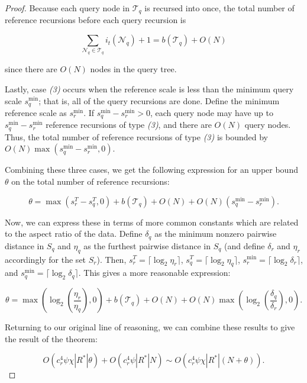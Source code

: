 \begin{proof}
Because each query node in $\mathscr{T}_q$ is recursed into once, the total
number of reference recursions before each query recursion is

\begin{equation}
\sum_{\mathscr{N}_q \in \mathscr{T}_q} i_t(\mathscr{N}_q) + 1 = b(\mathscr{T}_q) +
O(N)
\end{equation}

\noindent since there are $O(N)$ nodes in the query tree.

Lastly, case \textit{(3)} occurs when the reference scale is less than the
minimum query scale $s_q^{\min}$; that is, all of the query recursions are done.
Define the minimum reference scale as $s_r^{\min}$.  If $s_q^{\min} - s_r^{\min}
> 0$, each query node may have up to $s_q^{\min} - s_r^{\min}$ reference
recursions of type \textit{(3)}, and there are $O(N)$ query nodes.  Thus, the
total number of reference recursions of type \textit{(3)} is bounded by $O(N)
\max(s_q^{\min} - s_r^{\min}, 0)$.

Combining these three cases, we get the following expression for an upper bound
$\theta$ on the total number of reference recursions:

\begin{equation}
\theta = \max(s_r^T - s_q^T, 0) + b(\mathscr{T}_q) + O(N) + O(N) (s_q^{\min} -
s_r^{\min}).
\end{equation}

Now, we can express these in terms of more common constants which are related to
the aspect ratio of the data.  Define $\delta_q$ as the minimum nonzero pairwise
distance in $S_q$ and $\eta_q$ as the furthest pairwise distance in $S_q$ (and
define $\delta_r$ and $\eta_r$ accordingly for the set $S_r$).  Then, $s_r^T =
\lceil \log_2 \eta_r \rceil$, $s_q^T = \lceil \log_2 \eta_q \rceil$, $s_r^{\min}
= \lceil \log_2 \delta_r \rceil$, and $s_q^{\min} = \lceil \log_2 \delta_q
\rceil$.  This gives a more reasonable expression:

\begin{equation}
\theta = \max\left(\log_2\left(\frac{\eta_r}{\eta_q}\right), 0\right) +
b(\mathscr{T}_q) + O(N) + O(N)
\max\left(\log_2\left(\frac{\delta_q}{\delta_r}\right), 0\right).
\end{equation}

Returning to our original line of reasoning, we can combine these results to
give the result of the theorem:

\begin{equation}
O(c_r^4 \psi \chi | R^* | \theta) + O(c_r^4 \psi | R^* | N) \sim O(c_r^4 \psi
\chi |R^*| (N + \theta)).
\end{equation}
\end{proof}


